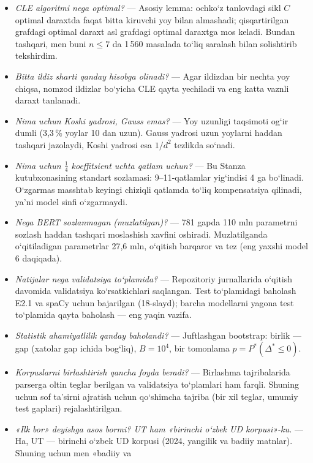 \documentclass[14pt,a4paper]{extarticle}
\begin{document}
\begin{itemize}
  \item \textit{CLE algoritmi nega optimal?} --- Asosiy lemma: ochko‘z tanlovdagi sikl $C$ optimal
        daraxtda faqat bitta kiruvchi yoy bilan almashadi; qisqartirilgan grafdagi optimal daraxt asl
        grafdagi optimal daraxtga mos keladi. Bundan tashqari, men buni $n\le7$ da 1\,560 masalada
        to‘liq saralash bilan solishtirib tekshirdim.
  \item \textit{Bitta ildiz sharti qanday hisobga olinadi?} --- Agar ildizdan bir nechta yoy chiqsa,
        nomzod ildizlar bo‘yicha CLE qayta yechiladi va eng katta vaznli daraxt tanlanadi.
  \item \textit{Nima uchun Koshi yadrosi, Gauss emas?} --- Yoy uzunligi taqsimoti og‘ir dumli
        (3,3\,\% yoylar 10 dan uzun). Gauss yadrosi uzun yoylarni haddan tashqari jazolaydi, Koshi
        yadrosi esa $1/d^2$ tezlikda so‘nadi.
  \item \textit{Nima uchun $\tfrac14$ koeffitsient uchta qatlam uchun?} --- Bu Stanza kutubxonasining
        standart sozlamasi: 9--11-qatlamlar yig‘indisi 4 ga bo‘linadi. O‘zgarmas masshtab keyingi
        chiziqli qatlamda to‘liq kompensatsiya qilinadi, ya’ni model sinfi o‘zgarmaydi.
  \item \textit{Nega BERT sozlanmagan (muzlatilgan)?} --- 781 gapda 110 mln parametrni sozlash haddan
        tashqari moslashish xavfini oshiradi. Muzlatilganda o‘qitiladigan parametrlar 27,6 mln,
        o‘qitish barqaror va tez (eng yaxshi model 6 daqiqada).
  \item \textit{Natijalar nega validatsiya to‘plamida?} --- Repozitoriy jurnallarida o‘qitish davomida
        validatsiya ko‘rsatkichlari saqlangan. Test to‘plamidagi baholash E2.1 va spaCy uchun bajarilgan
        (18-slayd); barcha modellarni yagona test to‘plamida qayta baholash --- eng yaqin vazifa.
  \item \textit{Statistik ahamiyatlilik qanday baholandi?} --- Juftlashgan bootstrap: birlik --- gap
        (xatolar gap ichida bog‘liq), $B=10^4$, bir tomonlama $p=P^{*}(\Delta^{*}\le0)$.
  \item \textit{Korpuslarni birlashtirish qancha foyda beradi?} --- Birlashma tajribalarida parserga
        oltin teglar berilgan va validatsiya to‘plamlari ham farqli. Shuning uchun sof ta’sirni
        ajratish uchun qo‘shimcha tajriba (bir xil teglar, umumiy test gaplari) rejalashtirilgan.
  \item \textit{«Ilk bor» deyishga asos bormi? UT ham «birinchi o‘zbek UD korpusi»-ku.} --- Ha, UT ---
        birinchi o‘zbek UD korpusi (2024, yangilik va badiiy matnlar). Shuning uchun men «badiiy va

\end{itemize}
\end{document}
